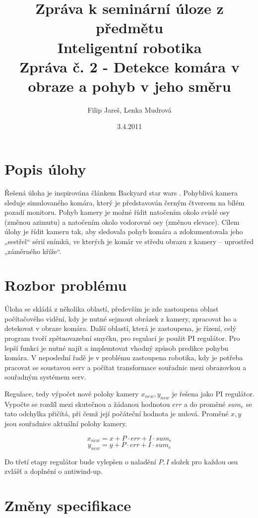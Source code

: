 \documentclass[a4paper,10pt]{article}
\title{Zpráva k seminární úloze z předmětu\\ Inteligentní robotika \\ {\small Zpráva č. 2 - Detekce komára v obraze a pohyb v jeho směru}}
\author{Filip Jareš, Lenka Mudrová}
\date{3.4.2011}
\begin{document}
\maketitle
\newpage


\section{Popis úlohy}

		Řešená úloha je inspirována článkem Backyard star wars \cite{zadani}. Pohyblivá
		kamera sleduje simulovaného komára, který je představován černým čtvercem na
		bílém pozadí monitoru. Pohyb kamery je možné řídit natočením okolo svislé osy
		(změnou azimutu) a natočením okolo vodorovné osy (změnou elevace). Cílem úlohy
		je řídit kameru tak, aby sledovala pohyb komára a zdokumentovala jeho „sestřel“
		sérií snímků, ve kterých je komár ve středu obrazu z kamery – uprostřed
		„záměrného kříže“.

\section{Rozbor problému}

		Úloha se skládá z několika oblastí, především je zde zastoupena oblast
		počítačového vidění, kdy je nutné sejmout obrázek z kamery, zpracovat ho a
		detekovat v obraze komára. Další oblastí, která je zastoupena, je řízení, celý
		program tvoří zpětnovazební smyčku, pro regulaci je použit PI regulátor. Pro
		lepší funkci je nutné najít a implemtovat vhodný způsob predikce pohybu komára.
		V neposlední řadě je v problému zastoupena robotika, kdy je potřeba pracovat se
		soustavou serv a počítat transformace souřadnic mezi obrazovkou a souřadným
		systémem serv.

		Regulace, tedy výpočet nové polohy kamery $x_{new}, y_{new}$ je řešena jako PI
		regulátor. Vypočte se rozdíl mezi skutečnou a žádanou hodnotou $err$ a do
		proměné $sum_e$ se tato odchylka přičítá, při čemž její počáteční hodnota je
		nulová. Proměné $x, y$ jsou souřadnice aktuální polohy kamery.

		$$x_{new} = x + P\cdot err + I\cdot sum_e$$
		$$y_{new} = y + P\cdot err + I\cdot sum_e$$

		Do třetí etapy regulátor bude vylepšen o naladění $P, I$ složek pro každou osu
		zvlášť a doplnění o antiwind-up. 

\section{Změny specifikace}
\end{document}
